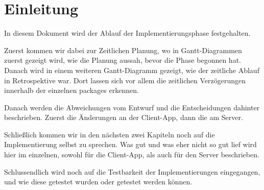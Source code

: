 
\section{Einleitung}

    In diesem Dokument wird der Ablauf der Implementierungsphase festgehalten.

    Zuerst kommen wir dabei zur Zeitlichen Planung, wo in Gantt-Diagrammen zuerst gezeigt wird, wie die Planung aussah, bevor die Phase begonnen hat. Danach wird in einem weiteren Gantt-Diagramm gezeigt, wie der zeitliche Ablauf in Retrospektive war. Dort lassen sich vor allem die zeitlichen Verzögerungen innerhalb der einzelnen packages erkennen.

    Danach werden die Abweichungen vom Entwurf und die Entscheidungen dahinter beschrieben. Zuerst die Änderungen an der Client-App, dann die am Server.

    Schließlich kommen wir in den nächsten zwei Kapiteln noch auf die Implementierung selbst zu sprechen. Was gut und was eher nicht so gut lief wird hier im einzelnen, sowohl für die Client-App, als auch für den Server beschrieben.

    Schlussendlich wird noch auf die Testbarkeit der Implementierungen eingegangen, und wie diese getestet wurden oder getestet werden können.
